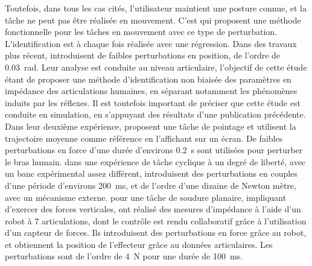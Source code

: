 \documentclass[12pt, a4paper]{article} %
\numberwithin{equation}{section}
\begin{document}
Toutefois, dans tous les cas cités, l'utilisateur maintient une posture connue, et la tâche ne peut pas être réalisée en mouvement. C'est \cite{burdet_method_2000} qui proposent une méthode fonctionnelle pour les tâches en mouvement avec ce type de perturbation. L'identification est à chaque fois réalisée avec une régression.
%
\newlineBlank
%
Dans des travaux plus récent, \cite{guarin_unbiased_2018} introduisent de faibles perturbations en position, de l'ordre de \SI{0.03}{\radian}. Leur analyse est conduite au niveau articulaire, l'objectif de cette étude étant de proposer une méthode d'identification non biaisée des paramètres en impédance des articulations humaines, en séparant notamment les phénomènes induits par les réflexes. Il est toutefois important de préciser que cette étude est conduite en simulation, en s'appuyant des résultats d'une publication précédente. 
%
\newlineBlank
%
Dans leur deuxième expérience, \cite{gomi_human_1997} proposent une tâche de pointage et utilisent la trajectoire moyenne comme référence en l'affichant sur un écran. De faibles perturbations en force d'une durée d'environs \SI{0.2}{\second} sont utilisées pour perturber le bras humain. \cite{abe_modulation_2003} dans une expérience de tâche cyclique à un degré de liberté, avec un banc expérimental assez différent, introduisent des perturbations en couples d'une période d'environs \SI{200}{\milli\second}, et de l'ordre d'une dizaine de Newton mètre, avec un mécanisme externe. \cite{erden_hand_2015} pour une tâche de soudure planaire, impliquant d'exercer des forces verticales, ont réalisé des mesures d'impédance à l'aide d'un robot à 7 articulations, dont le contrôle est rendu collaboratif grâce à l'utilisation d'un capteur de forces. Ils introduisent des perturbations en force grâce au robot, et obtiennent la position de l'effecteur grâce au données articulaires. Les perturbations sont de l'ordre de \SI{4}{\newton} pour une durée de \SI{100}{\milli\second}.
%
%
\end{document}
